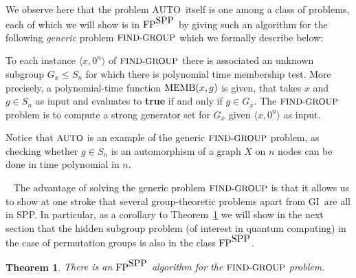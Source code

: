 \documentclass{article}
\newtheorem{theorem}{Theorem}[section]
\newenvironment{remark}{\begin{trivlist}%
\item[\hskip\labelsep{\bf Remark.}]~}{\end{trivlist}}
\newcommand{\FP}{\mbox{\rm FP}}
\newcommand{\SPP}{\mbox{\rm SPP}}
\newcommand{\AUTO}{\mbox{\small\rm AUTO}}
\newcommand{\FINDGROUP}{\mbox{\small\rm FIND{-}GROUP}}
\newcommand{\GI}{{\rm{GI}}}
\newcommand{\MEMB}{{\rm{MEMB}}}
\renewcommand{\angle}[1]{\langle #1\rangle}
\begin{document}
We observe here that the problem \AUTO\ itself is one among a class of
problems, each of which we will show is in $\FP^{\SPP}$ by giving such
an algorithm for the following {\em generic} problem $\FINDGROUP$
which we formally describe below:

To each instance $\angle{x,0^n}$ of $\FINDGROUP$ there is associated
an unknown subgroup $G_x\leq S_n$ for which there is polynomial time
membership test. More precisely, a polynomial-time function
$\MEMB(x,g)$ is given, that takes $x$ and $g\in S_n$ as input and
evaluates to {\bf true} if and only if $g\in G_x$.  The $\FINDGROUP$
problem is to compute a strong generator set for $G_x$ given
$\angle{x,0^n}$ as input.

Notice that $\AUTO$ is an example of the generic $\FINDGROUP$ problem,
as checking whether $g\in S_n$ is an automorphism of a graph $X$ on
$n$ nodes can be done in time polynomial in $n$.

\begin{remark}
  The advantage of solving the generic problem $\FINDGROUP$ is that it
  allows us to show at one stroke that several group-theoretic
  problems apart from \GI\ are all in SPP. In particular, as a
  corollary to Theorem~\ref{maintheorem} we will show in the next
  section that the hidden subgroup problem (of interest in quantum
  computing) in the case of permutation groups is also in the class
  $\FP^{\SPP}$.
\end{remark}

\begin{theorem}\label{maintheorem}
  There is an $\FP^{\SPP}$ algorithm for the $\FINDGROUP$ problem.
\end{theorem}
\end{document}
